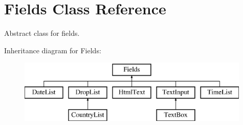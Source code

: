 \hypertarget{class_fields}{\section{Fields Class Reference}
\label{class_fields}
}


Abstract class for fields.  


Inheritance diagram for Fields\-:\begin{figure}[H]
\begin{center}
\leavevmode
\includegraphics[height=3.000000cm]{class_fields}
\end{center}
\end{figure}
